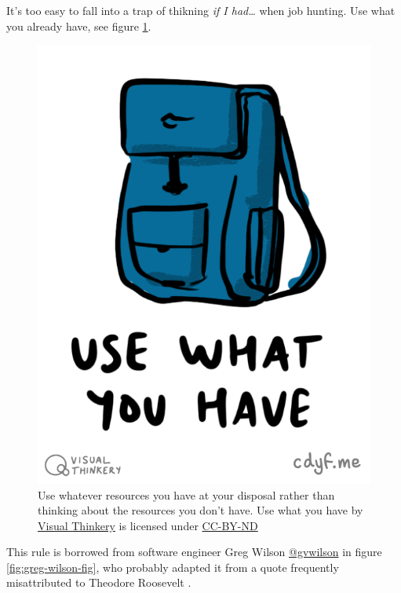 \documentclass[
]{book}
\begin{document}
It's too easy to fall into a trap of thikning \emph{if I had\ldots{}} when job hunting. Use what you already have, see figure \ref{fig:usewhatyouhave-fig}.

\begin{figure}

{\centering \includegraphics[width=0.5\linewidth]{images/Use what you have} 

}

\caption{Use whatever resources you have at your disposal rather than thinking about the resources you don't have. Use what you have by \href{https://visualthinkery.com}{Visual Thinkery} is licensed under \href{https://creativecommons.org/licenses/by-nd/4.0/}{CC-BY-ND}}\label{fig:usewhatyouhave-fig}
\end{figure}



This rule is borrowed from software engineer Greg Wilson \href{https://github.com/gvwilson}{@gvwilson} in figure \ref{fig:greg-wilson-fig}, who probably adapted it from a quote frequently misattributed to Theodore Roosevelt \citep{teddy}.
\end{document}
